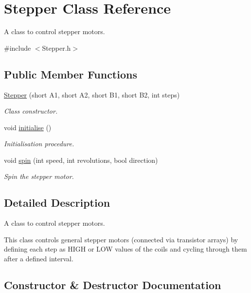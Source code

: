 \hypertarget{classStepper}{}\section{Stepper Class Reference}
\label{classStepper}


A class to control stepper motors.  




{\ttfamily \#include $<$Stepper.\+h$>$}

\subsection*{Public Member Functions}
\begin{DoxyCompactItemize}
\item 
\mbox{\hyperlink{classStepper_a397cb4fa7c633917a0433f9455b54061}{Stepper}} (short A1, short A2, short B1, short B2, int steps)
\begin{DoxyCompactList}\small\item\em Class constructor. \end{DoxyCompactList}\item 
void \mbox{\hyperlink{classStepper_a04a7aba2471330da8f514860e6047f29}{initialise}} ()
\begin{DoxyCompactList}\small\item\em Initialisation procedure. \end{DoxyCompactList}\item 
void \mbox{\hyperlink{classStepper_a2e8ab51c08dd6773e62721460565af08}{spin}} (int speed, int revolutions, bool direction)
\begin{DoxyCompactList}\small\item\em Spin the stepper motor. \end{DoxyCompactList}\end{DoxyCompactItemize}


\subsection{Detailed Description}
A class to control stepper motors. 

This class controls general stepper motors (connected via transistor arrays) by defining each step as H\+I\+GH or L\+OW values of the coils and cycling through them after a defined interval. 

\subsection{Constructor \& Destructor Documentation}
\mbox{\label{classStepper_a397cb4fa7c633917a0433f9455b54061}} 
